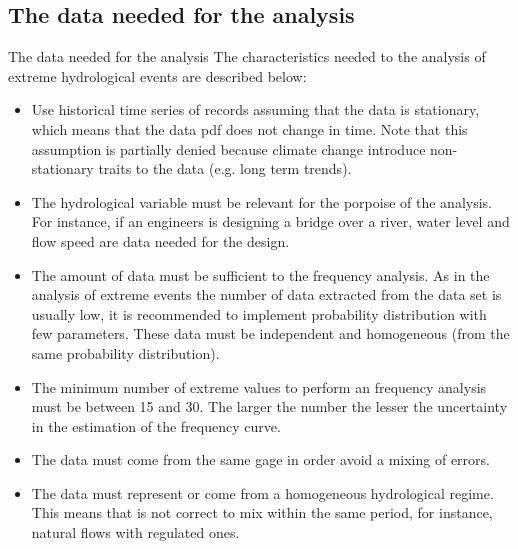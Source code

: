 \documentclass[8pt]{beamer}
\renewcommand{\emph}[1]{\textcolor{myorange}{#1}}
\begin{document}
\subsection{The data needed for the analysis}
\begin{frame}{The data needed for the analysis}
The characteristics needed to the analysis of extreme hydrological events are described below:
\begin{itemize}
\item Use historical time series of records assuming that the data is \emph{stationary}, which means that the data \emph{pdf} does not change in time. Note that this assumption is partially denied because \emph{climate change} introduce non-stationary traits to the data (e.g. long term trends). 
\item The hydrological variable must be \emph{relevant} for the porpoise of the analysis. For instance, if an engineers is \emph{designing a bridge} over a river, \emph{water level} and \emph{flow speed} are data needed for the design.   
\item The amount of data must be sufficient to the frequency analysis. As in the analysis of extreme events the number of data extracted from the data set is usually low, it is recommended to implement \emph{probability distribution} with \emph{few parameters}. These data must be \emph{independent and homogeneous} (from the same probability distribution). 
\item The \emph{minimum number} of extreme values to perform an \emph{frequency analysis} must be \emph{between 15 and 30}. The larger the number the lesser the uncertainty in the estimation of the frequency curve.  
\item The \emph{data} must come from the \emph{same gage} in order avoid a \emph{mixing of errors}. 
\item The \emph{data} must represent or come from a \emph{homogeneous hydrological regime}. This means that is not correct to mix within the same period, for instance, \emph{natural} flows with \emph{regulated} ones. 
\end{itemize}
\end{frame}
\end{document}
